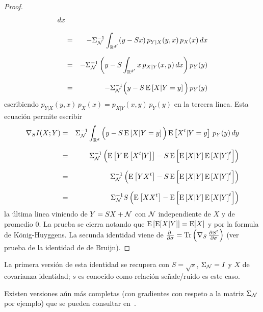 \begin{proof}
\begin{eqnarray*}
  dx\\[2.5mm]
  & = & - \Sigma_{\mathcal{N}}^{-1} \int_{\mathbb{R}^{d'}} (y - S x) \, p_{Y|X}(y,x) \, p_X(x) \,
  dx\\[2.5mm]
  & = & - \Sigma_{\mathcal{N}}^{-1} \left( y - S \int_{\mathbb{R}^{d'}} x \, p_{X|Y}(x,y) \,dx
  \right) p_Y(y)\\[2.5mm]
  & = & - \Sigma_{\mathcal{N}}^{-1} \Big( y - S \operatorname{E}\left[X | Y=y \right] \Big) \, p_Y(y)
  \end{eqnarray*}
  escribiendo $p_{Y|X}(y,x)  \, p_X(x) =  p_{X|Y}(x,y) \, p_Y(y)$ en  la tercera
  linea. Esta ecuaci\'on permite escribir
  \begin{eqnarray*}
  \nabla_S I(X;Y) & = & \Sigma_{\mathcal{N}}^{-1} \int_{\mathbb{R}^d} \Big( y - S \operatorname{E}\left[X |
  Y=y \right] \Big) \operatorname{E}\left[X^t | Y=y \right] \, p_Y(y) \, dy\\[2.5mm]
  & = & \Sigma_{\mathcal{N}}^{-1} \left( \operatorname{E}\left[ Y \operatorname{E}\left[ X^t|Y \right] \right] - S
  \operatorname{E}\left[ \operatorname{E}\left[X | Y \right] \operatorname{E}\left[X | Y \right]^t \right]
  \right)\\[2.5mm]
  & = & \Sigma_{\mathcal{N}}^{-1} \left( \operatorname{E}\left[ Y X^t \right] - S \operatorname{E}\left[ \operatorname{E}\left[X
  | Y \right] \operatorname{E}\left[X | Y \right]^t \right] \right)\\[2.5mm]
  & = & \Sigma_{\mathcal{N}}^{-1} S \left( \operatorname{E}\left[ X X^t \right] - \operatorname{E}\left[
  \operatorname{E}\left[X | Y \right] \operatorname{E}\left[X | Y \right]^t \right] \right)
  \end{eqnarray*}
  la \'ultima linea viniendo de $Y = S X + \mathcal{N}$ con $\mathcal{N}$ independiente de
  $X$ y  de promedio 0.  La  prueba se cierra notando  que $\operatorname{E}\left[ \operatorname{E}[X|Y]
  \right] = \operatorname{E}[X]$ y por  la formula de K\"onig-Huyggens. La secunda identidad
  viene  de  $\frac{\partial \cdot}{\partial  \sigma}  =  \operatorname{Tr}\left( \nabla_S  \,
    \frac{\partial S^t}{\partial \sigma} \right)$ (ver prueba de la identidad de
  de Bruijn).
\end{proof}
%
\noindent La primera versi\'on de esta identidad se recupera con $S = \sqrt{s}$,
$\Sigma_{\mathcal{N}}  =  I$  y $X$  de  covarianza  identidad;  $s$ es  conocido  como
relaci\'on se\~nale/ruido es este caso.

Existen versiones  a\'un m\'as completas (con  gradientes con respeto  a la matriz
$\Sigma_{\mathcal{N}}$ por  ejemplo) que se pueden  consultar en~\cite{Joh04, PalVer06,
  PayPal09}.

\begin{figure}[h!]
%
\begin{center}  \end{center}
%
%
\label{fig:SZ:deBruijnVerdu}
\end{figure}
\

